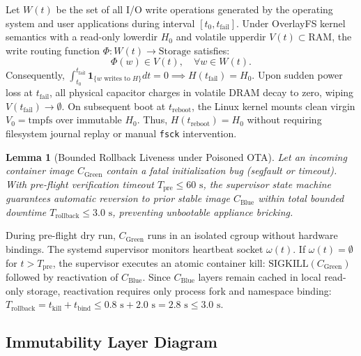 \documentclass[conference]{IEEEtran}
\newtheorem{lemma}{Lemma}
\begin{document}
\begin{IEEEproof}
Let $W(t)$ be the set of all I/O write operations generated by the operating system and user applications during interval $[t_0, t_{\mathrm{fail}}]$. Under OverlayFS kernel semantics with a read-only lowerdir $H_0$ and volatile upperdir $V(t) \subset \text{RAM}$, the write routing function $\Phi: W(t) \to \text{Storage}$ satisfies:
\begin{equation}
\Phi(w) \in V(t), \quad \forall w \in W(t).
\end{equation}
Consequently, $\int_{t_0}^{t_{\mathrm{fail}}} \mathbf{1}_{\{w \text{ writes to } H\}} dt = 0 \implies H(t_{\mathrm{fail}}) = H_0$. Upon sudden power loss at $t_{\mathrm{fail}}$, all physical capacitor charges in volatile DRAM decay to zero, wiping $V(t_{\mathrm{fail}}) \to \emptyset$. On subsequent boot at $t_{\mathrm{reboot}}$, the Linux kernel mounts clean virgin $V_0 = \text{tmpfs}$ over immutable $H_0$. Thus, $H(t_{\mathrm{reboot}}) = H_0$ without requiring filesystem journal replay or manual \texttt{fsck} intervention.
\end{IEEEproof}

\begin{lemma}[Bounded Rollback Liveness under Poisoned OTA]
Let an incoming container image $C_{\mathrm{Green}}$ contain a fatal initialization bug (segfault or timeout). With pre-flight verification timeout $T_{\mathrm{pre}} \le 60\text{ s}$, the supervisor state machine guarantees automatic reversion to prior stable image $C_{\mathrm{Blue}}$ within total bounded downtime $T_{\mathrm{rollback}} \le 3.0\text{ s}$, preventing unbootable appliance bricking.
\end{lemma}

\begin{IEEEproof}
During pre-flight dry run, $C_{\mathrm{Green}}$ runs in an isolated cgroup without hardware bindings. The systemd supervisor monitors heartbeat socket $\omega(t)$. If $\omega(t) = \emptyset$ for $t > T_{\mathrm{pre}}$, the supervisor executes an atomic container kill: $\text{SIGKILL}(C_{\mathrm{Green}})$ followed by reactivation of $C_{\mathrm{Blue}}$. Since $C_{\mathrm{Blue}}$ layers remain cached in local read-only storage, reactivation requires only process fork and namespace binding: $T_{\mathrm{rollback}} = t_{\mathrm{kill}} + t_{\mathrm{bind}} \le 0.8\text{ s} + 2.0\text{ s} = 2.8\text{ s} \le 3.0\text{ s}$.
\end{IEEEproof}

\subsection{Immutability Layer Diagram}
\end{document}
